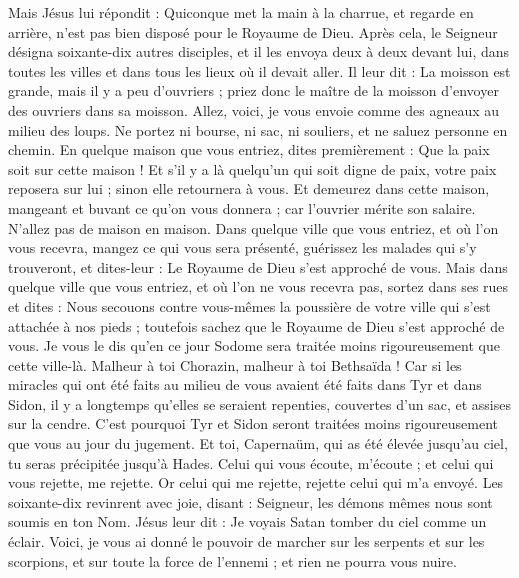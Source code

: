\begin{multicols}{2}
Mais Jésus lui répondit : Quiconque met la main à la charrue, et regarde en arrière, n'est pas bien disposé pour le Royaume de Dieu.
\VerseOne{}Après cela, le Seigneur désigna soixante-dix autres disciples, et il les envoya deux à deux devant lui, dans toutes les villes et dans tous les lieux où il devait aller.
Il leur dit : La moisson est grande, mais il y a peu d'ouvriers ; priez donc le maître de la moisson d’envoyer des ouvriers dans sa moisson.
Allez, voici, je vous envoie comme des agneaux au milieu des loups.
Ne portez ni bourse, ni sac, ni souliers, et ne saluez personne en chemin.
En quelque maison que vous entriez, dites premièrement : Que la paix soit sur cette maison !
Et s'il y a là quelqu'un qui soit digne de paix, votre paix reposera sur lui ; sinon elle retournera à vous.
Et demeurez dans cette maison, mangeant et buvant ce qu’on vous donnera ; car l'ouvrier mérite son salaire. N’allez pas de maison en maison.
Dans quelque ville que vous entriez, et où l’on vous recevra, mangez ce qui vous sera présenté,
guérissez les malades qui s’y trouveront, et dites-leur : Le Royaume de Dieu s’est approché de vous.
Mais dans quelque ville que vous entriez, et où l’on ne vous recevra pas, sortez dans ses rues et dites :
Nous secouons contre vous-mêmes la poussière de votre ville qui s'est attachée à nos pieds ; toutefois sachez que le Royaume de Dieu s’est approché de vous.
Je vous le dis qu'en ce jour Sodome sera traitée moins rigoureusement que cette ville-là.
Malheur à toi Chorazin, malheur à toi Bethsaïda ! Car si les miracles qui ont été faits au milieu de vous avaient été faits dans Tyr et dans Sidon, il y a longtemps qu'elles se seraient repenties, couvertes d'un sac, et assises sur la cendre.
C'est pourquoi Tyr et Sidon seront traitées moins rigoureusement que vous au jour du jugement.
Et toi, Capernaüm, qui as été élevée jusqu'au ciel, tu seras précipitée jusqu'à Hades.
Celui qui vous écoute, m'écoute ; et celui qui vous rejette, me rejette. Or celui qui me rejette, rejette celui qui m’a envoyé.
Les soixante-dix revinrent avec joie, disant : Seigneur, les démons mêmes nous sont soumis en ton Nom.
Jésus leur dit : Je voyais Satan tomber du ciel comme un éclair.
Voici, je vous ai donné le pouvoir de marcher sur les serpents et sur les scorpions, et sur toute la force de l'ennemi ; et rien ne pourra vous nuire.

\end{multicols}
